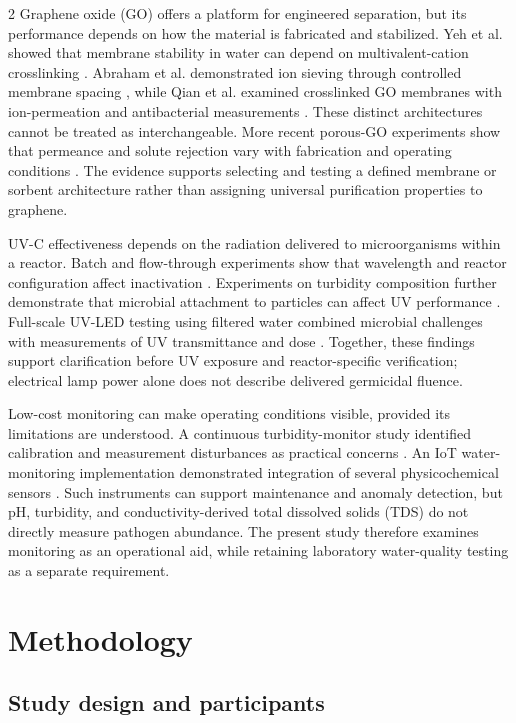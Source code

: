 \documentclass{ieeeaccess}
\begin{document}
\begin{multicols}{2}
Graphene oxide (GO) offers a platform for engineered separation, but its performance depends on how the material is fabricated and stabilized. Yeh et al. showed that membrane stability in water can depend on multivalent-cation crosslinking \cite{r6}. Abraham et al. demonstrated ion sieving through controlled membrane spacing \cite{r7}, while Qian et al. examined crosslinked GO membranes with ion-permeation and antibacterial measurements \cite{r8}. These distinct architectures cannot be treated as interchangeable. More recent porous-GO experiments show that permeance and solute rejection vary with fabrication and operating conditions \cite{r9}. The evidence supports selecting and testing a defined membrane or sorbent architecture rather than assigning universal purification properties to graphene.

UV-C effectiveness depends on the radiation delivered to microorganisms within a reactor. Batch and flow-through experiments show that wavelength and reactor configuration affect inactivation \cite{r10}. Experiments on turbidity composition further demonstrate that microbial attachment to particles can affect UV performance \cite{r11}. Full-scale UV-LED testing using filtered water combined microbial challenges with measurements of UV transmittance and dose \cite{r12}. Together, these findings support clarification before UV exposure and reactor-specific verification; electrical lamp power alone does not describe delivered germicidal fluence.

Low-cost monitoring can make operating conditions visible, provided its limitations are understood. A continuous turbidity-monitor study identified calibration and measurement disturbances as practical concerns \cite{r13}. An IoT water-monitoring implementation demonstrated integration of several physicochemical sensors \cite{r14}. Such instruments can support maintenance and anomaly detection, but pH, turbidity, and conductivity-derived total dissolved solids (TDS) do not directly measure pathogen abundance. The present study therefore examines monitoring as an operational aid, while retaining laboratory water-quality testing as a separate requirement.

\section{Methodology}

\subsection{Study design and participants}


\end{multicols}
\end{document}
